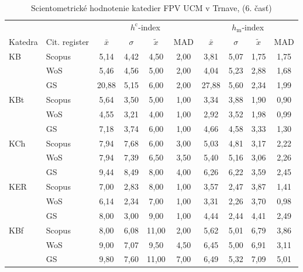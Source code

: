 {\begin{table}
  \centering\small
  \caption[Hodnotenie FPV\,--\,$h^{\mathrm{c}}$-index a $h_{\mathrm{m}}$-index]{Scientometrické hodnotenie katedier FPV UCM v Trnave, (6. časť)}
\label{tab:6-staff.results}
\begin{tabularx}{\textwidth}{XXcccc@{\hspace{3ex}}cccc}
  \toprule\noalign{\vspace{.3ex}}
       &      & \multicolumn{4}{c}{$h^{\mathrm{c}}$-index} & \multicolumn{4}{c}{$h_{\mathrm{m}}$-index} \\
 Katedra      & Cit. register& $\bar{x}$      & $\sigma$  & $\tilde{x}$ & MAD  & $\bar{x}$      & $\sigma$  & $\tilde{x}$  & MAD  \\[0.3ex]
  \midrule\noalign{\vspace{.5ex}}
 KB   & Scopus & 5,14     & 4,42 & 4,50  & 2,00 & 3,81     & 5,07 & 1,75 & 1,75 \\
      & WoS    & 5,46     & 4,56 & 5,00  & 2,00 & 4,04     & 5,23 & 2,88 & 1,68 \\
      & GS     & 20,88    & 5,15 & 6,00  & 2,00 & 27,88    & 5,60 & 2,34 & 1,99 \\[3ex]
 KBt  & Scopus & 5,64     & 3,50 & 5,00  & 1,00 & 3,34     & 3,88 & 1,90 & 0,90 \\
      & WoS    & 4,55     & 3,21 & 4,00  & 1,00 & 2,92     & 3,52 & 1,98 & 0,99 \\
      & GS     & 7,18     & 3,74 & 6,00  & 1,00 & 4,66     & 4,58 & 3,33 & 1,30 \\[3ex]
 KCh  & Scopus & 7,94     & 7,68 & 6,00  & 3,00 & 5,03     & 4,81 & 3,17 & 2,22 \\
      & WoS    & 7,94     & 7,39 & 6,50  & 3,50 & 5,40     & 5,16 & 3,06 & 2,26 \\
      & GS     & 9,44     & 8,49 & 8,00  & 4,00 & 6,26     & 6,22 & 3,59 & 2,45 \\[3ex]
 KER  & Scopus & 7,00     & 2,83 & 8,00  & 1,00 & 3,57     & 2,47 & 3,87 & 1,41 \\
      & WoS    & 6,14     & 2,34 & 7,00  & 1,00 & 3,31     & 2,26 & 3,70 & 0,98 \\
      & GS     & 8,00     & 3,00 & 9,00  & 1,00 & 4,44     & 2,44 & 4,41 & 2,49 \\[3ex]
 KBf  & Scopus & 8,00     & 6,08 & 11,00 & 2,00 & 5,62     & 5,01 & 6,79 & 3,86 \\
      & WoS    & 9,00     & 7,07 & 9,50  & 4,50 & 6,45     & 5,00 & 6,91 & 3,11 \\
      & GS     & 9,80     & 7,60 & 11,00 & 7,00 & 6,49     & 5,32 & 7,09 & 5,01 \\[3ex]

\end{tabularx}
\end{table}}
